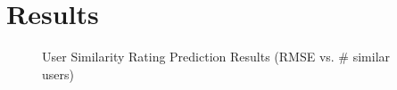 \section{Results}
\label{sec:results}



\begin{figure}
\center
{}
\caption{User Similarity Rating Prediction Results (RMSE vs. \# similar users)}
\label{fig:user_similarity}  
\end{figure}



